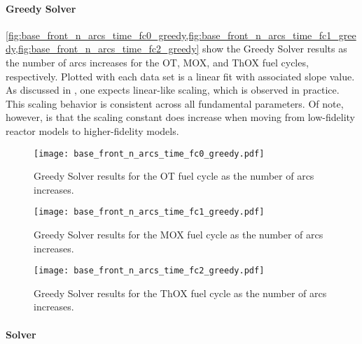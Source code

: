 \paragraph{Greedy Solver}

\cref{fig:base_front_n_arcs_time_fc0_greedy,fig:base_front_n_arcs_time_fc1_greedy,fig:base_front_n_arcs_time_fc2_greedy}
show the Greedy Solver results as the number of arcs increases for the OT, MOX,
and ThOX fuel cycles, respectively. Plotted with each data set is a linear fit
with associated slope value. As discussed in , one expects
linear-like scaling, which is observed in practice. This scaling behavior is
consistent across all fundamental parameters. Of note, however, is that the
scaling constant does increase when moving from low-fidelity reactor models to
higher-fidelity models.

\begin{figure}[h!]
  \begin{center}
    \texttt{[image: base\_front\_n\_arcs\_time\_fc0\_greedy.pdf]}
    \caption{
      \label{fig:base_front_n_arcs_time_fc0_greedy}
      Greedy Solver results for the OT fuel cycle as the number of arcs
      increases.  }
  \end{center}
\end{figure}

\begin{figure}[h!]
  \begin{center}
    \texttt{[image: base\_front\_n\_arcs\_time\_fc1\_greedy.pdf]}
    \caption{
      \label{fig:base_front_n_arcs_time_fc1_greedy}
      Greedy Solver results for the MOX fuel cycle as the number of arcs
      increases.
    }
  \end{center}
\end{figure}

\begin{figure}[h!]
  \begin{center}
    \texttt{[image: base\_front\_n\_arcs\_time\_fc2\_greedy.pdf]}
    \caption{
      \label{fig:base_front_n_arcs_time_fc2_greedy}
      Greedy Solver results for the ThOX fuel cycle as the number of arcs
      increases.
      }
  \end{center}
\end{figure}

\paragraph{\clp Solver}


